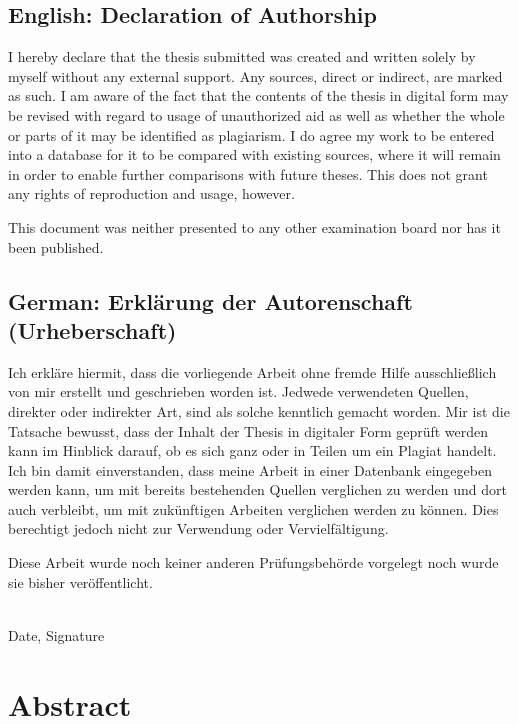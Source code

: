 \documentclass[a4paper, 11pt, oneside]{article}
\begin{document}
\subsection*{English: Declaration of Authorship}

I hereby declare that the thesis submitted was created and written
solely by myself without any external support. Any sources, direct
or indirect, are marked as such. I am aware of the fact that the
contents of the thesis in digital form may be revised with regard to
usage of unauthorized aid as well as whether the whole or parts of
it may be identified as plagiarism. I do agree my work to be entered
into a database for it to be compared with existing sources, where
it will remain in order to enable further comparisons with future
theses. This does not grant any rights of reproduction and usage,
however.

This document was neither presented to any other examination board
nor has it been published.

\subsection*{German: Erklärung der Autorenschaft (Urheberschaft)}

Ich erkläre hiermit, dass die vorliegende Arbeit ohne fremde Hilfe
ausschließlich von mir erstellt und geschrieben worden ist. Jedwede
verwendeten Quellen, direkter oder indirekter Art, sind als solche
kenntlich gemacht worden. Mir ist die Tatsache bewusst, dass der
Inhalt der Thesis in digitaler Form geprüft werden kann im Hinblick
darauf, ob es sich ganz oder in Teilen um ein Plagiat handelt. Ich
bin damit einverstanden, dass meine Arbeit in einer Datenbank
eingegeben werden kann, um mit bereits bestehenden Quellen
verglichen zu werden und dort auch verbleibt, um mit zukünftigen
Arbeiten verglichen werden zu können. Dies berechtigt jedoch nicht
zur Verwendung oder Vervielfältigung.

Diese Arbeit wurde noch keiner anderen Prüfungsbehörde vorgelegt
noch wurde sie bisher veröffentlicht.

\vspace{20mm}

\dotfill\\
Date, Signature

\newpage

\section*{Abstract}
\end{document}
